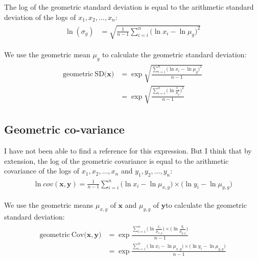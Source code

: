 \documentclass[12pt, oneside, titlepage]{article}   	%
\begin{document}
The log of the geometric standard deviation is equal to the arithmetic standard deviation of the logs of ${x_1, x_2, \dots, x_n}$:
%
\begin{align}
  \begin{split}
\ln ( \sigma_g )  & = \sqrt{ \frac{ 1} {n - 1} \sum\limits_{i=i}^n \big( \ln x_i - \ln \mu_g \big)^2  }
  \end{split}
\end{align}

We use the geometric mean $\mu_g$ to calculate the geometric standard deviation: 
%
\begin{align}
  \begin{split}
\mathrm{geometric\ SD(}\bm{x}\mathrm{)} & = \exp \sqrt{ \frac{\sum\limits_{i=i}^n \big( \ln x_i - \ln \mu_g \big)^2 } { n - 1 }}
\\ & = \exp \sqrt{ \frac{\sum\limits_{i=i}^n \big( \ln \frac{x_i}{\mu_g} \big)^2 } { n - 1 }}
  \end{split}
\end{align}

\subsection*{Geometric co-variance}

I have not been able to find a reference for this expression. But I think that by extension, the log of the geometric covariance is equal to the arithmetic covariance of the logs of ${x_1, x_2, \dots, x_n}$ and ${y_1, y_2, \dots, y_n}$:
%
\begin{align}
  \begin{split}
\ln  cov(\bm{x},\bm{y} ) = \frac{1 }{ n - 1 } \sum\limits_{i=i}^n \big( \ln x_i - \ln \mu_{x,g} \big) \times  \big( \ln y_i - \ln \mu_{y,g} \big) 
  \end{split}
\end{align}

We use the geometric means $\mu_{x,g}$ of $\bm{x}$ and $\mu_{y,g}$ of $\bm{y}$to calculate the geometric standard deviation: 
%
\begin{align}
  \begin{split}
\mathrm{geometric\ Cov(}\bm{x,y}\mathrm{)} & = \exp \frac{\sum\limits_{i=i}^n \big( \ln \frac{x_i}{\mu_{x,g}} \big) \times \big( \ln \frac{y_i}{\mu_{y,g} }  \big) } { n - 1 } 
\\ & = \exp \frac{\sum\limits_{i=i}^n \big( \ln x_i - \ln \mu_{x,g} \big) \times  \big( \ln y_i - \ln \mu_{y,g} \big) } { n - 1 }
  \end{split}
\end{align}
\end{document}
